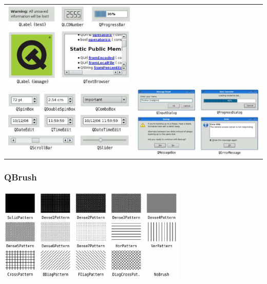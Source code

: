 \begin{tabular}{c c}
	\includegraphics[width=9cm]{images/button_5.png}\\
	\includegraphics[width=9cm]{images/button_6.png}&
	\includegraphics[width=9cm]{images/button_8.png}\\
\end{tabular}
\subsubsection{QBrush}
\includegraphics[width=9cm]{images/brush.png}

